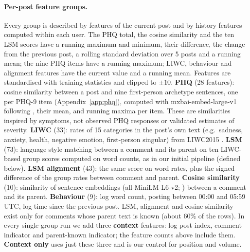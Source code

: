 \documentclass[11pt]{article}
\begin{document}
\paragraph{Per-post feature groups.}
Every group is described by features of the current post and by history features computed within each user.
The PHQ total, the cosine similarity and the ten LSM scores have a running maximum and minimum, their difference, the change from the previous post, a rolling standard deviation over 5 posts and a running mean; the nine PHQ items have a running maximum; LIWC, behaviour and alignment features have the current value and a running mean.
Features are standardised with training statistics and clipped to $\pm10$.
\textbf{PHQ} (28 features): cosine similarity between a post and nine first-person archetype sentences, one per PHQ-9 item (Appendix~\ref{app:phq}), computed with mxbai-embed-large-v1 \citep{lee2024mxbai,li2023angle} following \citet{lahnala2025unifying}, their mean, and running maxima per item.
These are similarities inspired by symptoms, not observed PHQ responses or validated estimates of severity.
\textbf{LIWC} (33): rates of 15 categories in the post's own text (e.g.\ sadness, anxiety, health, negative emotion, first-person singular) from LIWC2015 \citep{pennebaker2015liwc}.
\textbf{LSM} (73): language style matching \citep{ireland2010language} between a comment and its parent on ten LIWC-based group scores computed on word counts, as in our initial pipeline (defined below).
\textbf{LSM alignment} (43): the same score on word rates, plus the signed difference of the group rates between comment and parent.
\textbf{Cosine similarity} (10): similarity of sentence embeddings (all-MiniLM-L6-v2; \citealp{reimers-gurevych-2019-sentence}) between a comment and its parent.
\textbf{Behaviour} (9): log word count, posting between 00:00 and 05:59 UTC, log time since the previous post.
LSM, alignment and cosine similarity exist only for comments whose parent text is known (about 60\% of the rows).
In every single-group run we add three \textbf{context} features: log post index, comment indicator and parent-known indicator; the feature counts above include them.
\textbf{Context only} uses just these three and is our control for position and volume.
\end{document}
